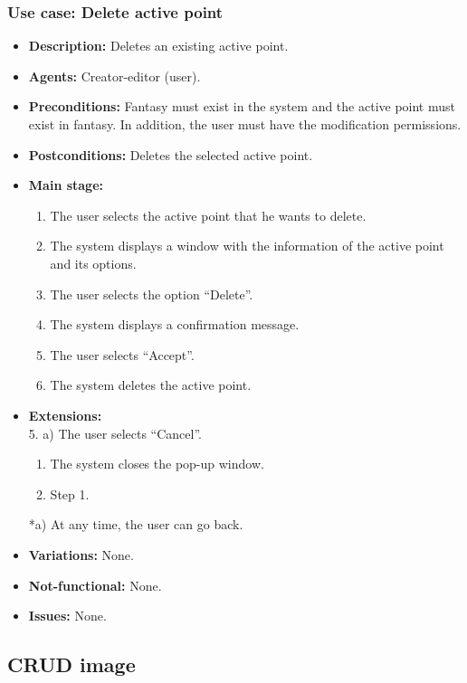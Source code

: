 \subsubsection{Use case: Delete active point}
\begin{itemize}
	\item \textbf{Description:} Deletes an existing active point.
	\item \textbf{Agents:} Creator-editor (user).
	\item \textbf{Preconditions:} Fantasy must exist in the system and the active point must exist in fantasy. In addition, the user must have the modification permissions.
	\item \textbf{Postconditions:} Deletes the selected active point.
	\item \textbf{Main stage:}
	\begin{enumerate}
		\item The user selects the active point that he wants to delete.
		\item The system displays a window with the information of the active point and its options.
		\item The user selects the option ``Delete''.
		\item The system displays a confirmation message.
		\item The user selects ``Accept''.
		\item The system deletes the active point.
	\end{enumerate}
	\item \textbf{Extensions:} \\ 5. a) The user selects ``Cancel''.
	\begin{enumerate}
		\item The system closes the pop-up window.
		\item Step 1.
	\end{enumerate}
	*a) At any time, the user can go back.
	\item \textbf{Variations:} None.
	\item \textbf{Not-functional:} None.
	\item \textbf{Issues:} None.
\end{itemize}

\subsection{CRUD image}
\hypertarget{crearimagen}{}
